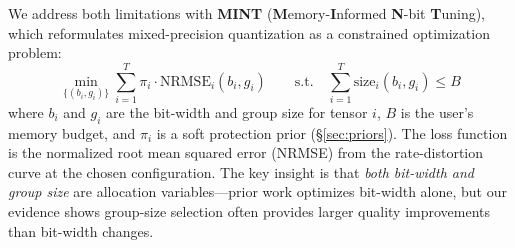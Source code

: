 \documentclass{article}
\begin{document}
We address both limitations with \textbf{MINT} (\textbf{M}emory-\textbf{I}nformed \textbf{N}-bit \textbf{T}uning), which reformulates mixed-precision quantization as a constrained optimization problem:
\begin{equation}
    \min_{\{(b_i, g_i)\}} \sum_{i=1}^{T} \pi_i \cdot \text{NRMSE}_i(b_i, g_i) \qquad
    \text{s.t.} \quad \sum_{i=1}^{T} \text{size}_i(b_i, g_i) \leq B
    \label{eq:objective}
\end{equation}
where $b_i$ and $g_i$ are the bit-width and group size for tensor $i$, $B$ is the user's memory budget, and $\pi_i$ is a soft protection prior (\S\ref{sec:priors}). The loss function is the normalized root mean squared error (NRMSE) from the rate-distortion curve at the chosen configuration. The key insight is that \emph{both bit-width and group size} are allocation variables---prior work optimizes bit-width alone, but our evidence shows group-size selection often provides larger quality improvements than bit-width changes.
\end{document}

